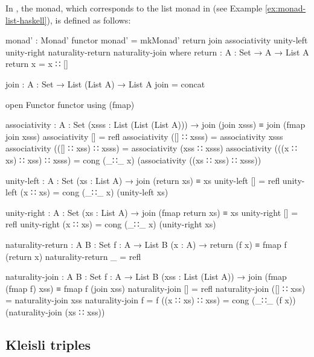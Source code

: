 \begin{example}
  \label{ex:monad-list-agda}

  In \agda, the  monad, which corresponds to the list
  monad in \hask (see Example \ref{ex:monad-list-haskell}), is defined
  as follows:
  \begin{codeagda}
monad' : Monad' functor
monad' = mkMonad' return join associativity unity-left unity-right
                  naturality-return naturality-join
  where
    return : {A : Set} → A → List A
    return x = x ∷ []

    join : {A : Set} → List (List A) → List A
    join = concat

    open Functor functor using (fmap)

    associativity : {A : Set} (xsss : List (List (List A))) →
                    join (join xsss) ≡ join (fmap join xsss)
    associativity []                        = refl
    associativity ([] ∷ xsss)               = associativity xsss
    associativity (([] ∷ xss) ∷ xsss)       =
      associativity (xss ∷ xsss)
    associativity (((x ∷ xs) ∷ xss) ∷ xsss) =
      cong (_∷_ x) (associativity ((xs ∷ xss) ∷ xsss))

    unity-left : {A : Set} (xs : List A) → join (return xs) ≡ xs
    unity-left []       = refl
    unity-left (x ∷ xs) = cong (_∷_ x) (unity-left xs)

    unity-right : {A : Set} (xs : List A) →
                  join (fmap return xs) ≡ xs
    unity-right []       = refl
    unity-right (x ∷ xs) = cong (_∷_ x) (unity-right xs)

    naturality-return : {A B : Set} {f : A → List B} (x : A) →
                        return (f x) ≡ fmap f (return x)
    naturality-return _ = refl

    naturality-join : {A B : Set} {f : A → List B}
                      (xss : List (List A)) →
                      join (fmap (fmap f) xss) ≡ fmap f (join xss)
    naturality-join         []               = refl
    naturality-join         ([] ∷ xss)       = naturality-join xss
    naturality-join {f = f} ((x ∷ xs) ∷ xss) =
      cong (_∷_ (f x)) (naturality-join (xs ∷ xss))
  \end{codeagda}

\end{example}

\subsection*{Kleisli triples}


